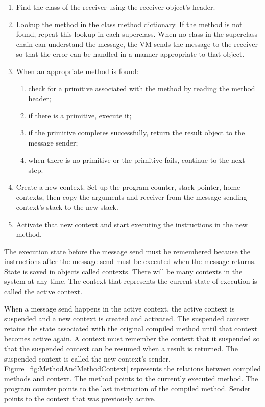 \documentclass[a4paper,10pt,twoside]{book}
\begin{document}
\begin{enumerate}

\item Find the class of the receiver using the receiver object's
  header.

\item Lookup the method in the class method dictionary. If the method
  is not found, repeat this lookup in each superclass. When no class
  in the superclass chain can understand the message, the VM sends the
  message  to the receiver so that the error
  can be handled in a manner appropriate to that object.

\item When an appropriate method is found:

  \begin{enumerate}
  \item check for a primitive associated with the method by reading
    the method header;
  \item if there is a primitive, execute it;
  \item if the primitive completes successfully, return the result object
    to the message sender;
  \item when there is no primitive or the primitive fails, continue to
    the next step.
  \end{enumerate}

\item Create a new context. Set up the program counter, stack pointer,
  home contexts, then copy the arguments and receiver from the message
  sending context's stack to the new stack.

\item Activate that new context and start executing the instructions
  in the new method.
\end{enumerate}

The execution state before the message send must be remembered because
the instructions after the message send must be executed when the
message returns. State is saved in objects called contexts. There will
be many contexts in the system at any time. The context that
represents the current state of execution is called the active
context.

When a message send happens in the active context, the active context
is suspended and a new context is created and activated. The
suspended context retains the state associated with the original
compiled method until that context becomes active again. A context
must remember the context that it suspended so that the suspended
context can be resumed when a result is returned. The suspended
context is called the new context's sender. Figure~\ref{fig:MethodAndMethodContext}
represents the relations between compiled methods and context. The method points to the currently executed method. The program counter points
to the last instruction of the compiled method. Sender points to the context that was previously active.  
\end{document}
